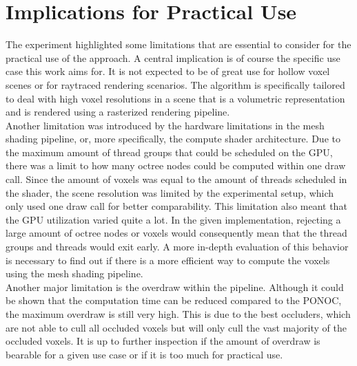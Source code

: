 \section{Implications for Practical Use}

The experiment highlighted some limitations that are essential to consider for the practical use of the approach. 
A central implication is of course the specific use case this work aims for. It is not expected to be of great use 
for hollow voxel scenes or for raytraced rendering scenarios. The algorithm is specifically tailored to deal with 
high voxel resolutions in a scene that is a volumetric representation and is rendered using a rasterized rendering 
pipeline. \\

\noindent
Another limitation was introduced by the hardware limitations in the mesh shading pipeline, or, more specifically, the 
compute shader architecture. Due to the maximum amount of thread groups that could be scheduled on the \ac{GPU}, there 
was a limit to how many octree nodes could be computed within one draw call. Since the amount of voxels was equal to the 
amount of threads scheduled in the shader, the scene resolution was limited by the experimental setup, which only used 
one draw call for better comparability. This limitation also meant that the \ac{GPU} utilization varied quite a lot. 
In the given implementation, rejecting a large amount of octree nodes or voxels would consequently mean that the thread 
groups and threads would exit early. A more in-depth evaluation of this behavior is necessary to find out if there is a 
more efficient way to compute the voxels using the mesh shading pipeline. \\

\noindent
Another major limitation is the overdraw within the pipeline. Although it could be shown that the computation time 
can be reduced compared to the \ac{PONOC}, the maximum overdraw is still very high. This is due to the best occluders, 
which are not able to cull all occluded voxels but will only cull the vast majority of the occluded voxels. It is up 
to further inspection if the amount of overdraw is bearable for a given use case or if it is too much for practical 
use. \\

